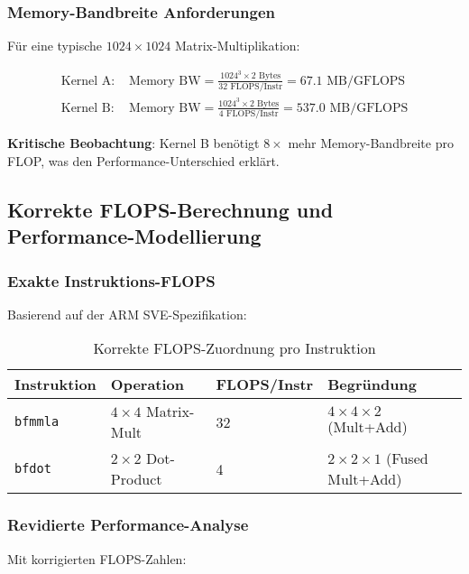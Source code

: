\documentclass[11pt,a4paper]{article}
\begin{document}
\subsubsection{Memory-Bandbreite Anforderungen}

Für eine typische $1024 \times 1024$ Matrix-Multiplikation:

\begin{align}
\text{Kernel A: } &\text{Memory BW} = \frac{1024^3 \times 2 \text{ Bytes}}{32 \text{ FLOPS/Instr}} = 67.1 \text{ MB/GFLOPS} \\
\text{Kernel B: } &\text{Memory BW} = \frac{1024^3 \times 2 \text{ Bytes}}{4 \text{ FLOPS/Instr}} = 537.0 \text{ MB/GFLOPS}
\end{align}

\textbf{Kritische Beobachtung}: Kernel B benötigt $8\times$ mehr Memory-Bandbreite pro FLOP, was den Performance-Unterschied erklärt.

\subsection{Korrekte FLOPS-Berechnung und Performance-Modellierung}

\subsubsection{Exakte Instruktions-FLOPS}

Basierend auf der ARM SVE-Spezifikation:

\begin{table}[h]
\centering
\caption{Korrekte FLOPS-Zuordnung pro Instruktion}
\begin{tabular}{|l|l|l|l|}
\hline
\textbf{Instruktion} & \textbf{Operation} & \textbf{FLOPS/Instr} & \textbf{Begründung} \\
\hline
\texttt{bfmmla} & $4 \times 4$ Matrix-Mult & 32 & $4 \times 4 \times 2$ (Mult+Add) \\
\texttt{bfdot} & $2 \times 2$ Dot-Product & 4 & $2 \times 2 \times 1$ (Fused Mult+Add) \\
\hline
\end{tabular}
\end{table}

\subsubsection{Revidierte Performance-Analyse}

Mit korrigierten FLOPS-Zahlen:
\end{document}
